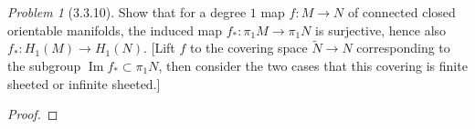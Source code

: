\documentclass[10pt]{article}
\newcommand{\sk}{\vskip 10mm}
\newcommand{\wt}[1]{\widetilde{#1}}
\DeclareMathOperator{\img}{Im}
\theoremstyle{remark}
\newtheorem{problem}{Problem}
\begin{document}
\sk

\begin{problem}[3.3.10]
  Show that for a degree $1$ map $f:M\rightarrow N$ of connected closed
  orientable manifolds, the induced map $f_*:\pi_1 M\rightarrow \pi_1 N$ is
  surjective, hence also $f_*:H_1(M)\rightarrow H_1(N)$. [Lift $f$ to the
  covering space $\wt{N}\rightarrow N$ corresponding to the subgroup
  $\img f_*\subset\pi_1 N$, then consider the two cases that this covering is
  finite sheeted or infinite sheeted.]
\end{problem}

\begin{proof}
  
\end{proof}
\end{document}
